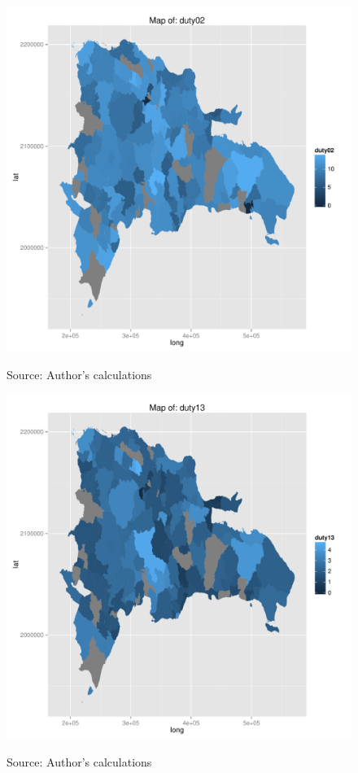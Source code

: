 \documentclass[12pt]{article}
\begin{document}
\begin{figure}[H]
\begin{center}
\includegraphics[scale=.75,keepaspectratio=true]{../Maps/drduty02.pdf}
\caption{\label{fig:Map1}}
Source: Author's calculations
\end{center}
\end{figure}

\begin{figure}[H]
\begin{center}
\includegraphics[scale=.75,keepaspectratio=true]{../Maps/drduty13.pdf}
\caption{\label{fig:Map2}}
Source: Author's calculations
\end{center}
\end{figure}
\end{document}
